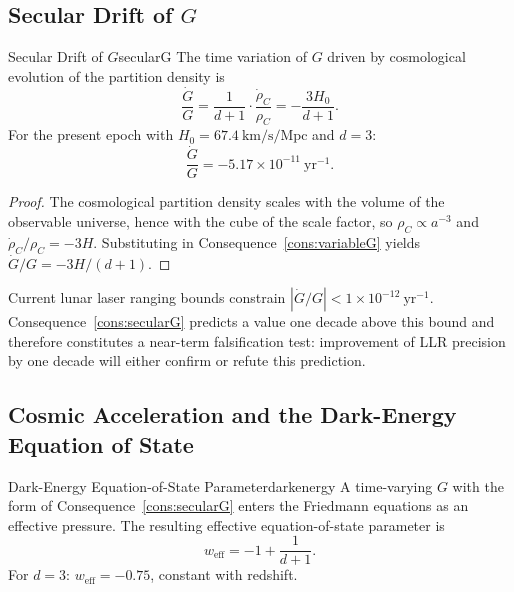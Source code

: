 \subsection{Secular Drift of $G$}
\label{sec:ch20-Gdot}

\begin{consequence}{Secular Drift of $G$}{secularG}
  The time variation of $G$ driven by cosmological evolution of the partition
  density is
  \begin{equation}\label{eq:secularG}
    \frac{\dot{G}}{G} = \frac{1}{d+1}\cdot\frac{\dot{\rho}_{C}}{\rho_{C}}
                      = -\frac{3H_{0}}{d+1}.
  \end{equation}
  For the present epoch with $H_{0} = 67.4~\mathrm{km/s/Mpc}$ and $d = 3$:
  \begin{equation}
    \frac{\dot{G}}{G} = -5.17\times10^{-11}~\mathrm{yr}^{-1}.
  \end{equation}
\end{consequence}

\begin{proof}
The cosmological partition density scales with the volume of the observable
universe, hence with the cube of the scale factor, so $\rho_{C} \propto a^{-3}$
and $\dot{\rho}_{C}/\rho_{C} = -3H$.
Substituting in Consequence~\ref{cons:variableG} yields
$\dot{G}/G = -3H/(d+1)$.
\end{proof}

\begin{remark}
Current lunar laser ranging bounds constrain $|\dot{G}/G| < 1\times10^{-12}~\mathrm{yr}^{-1}$.
Consequence~\ref{cons:secularG} predicts a value one decade above this bound
and therefore constitutes a near-term falsification test: improvement of LLR
precision by one decade will either confirm or refute this prediction.
\end{remark}

\subsection{Cosmic Acceleration and the Dark-Energy Equation of State}
\label{sec:ch20-darkenergy}

\begin{consequence}{Dark-Energy Equation-of-State Parameter}{darkenergy}
  A time-varying $G$ with the form of Consequence~\ref{cons:secularG} enters
  the Friedmann equations as an effective pressure.
  The resulting effective equation-of-state parameter is
  \begin{equation}\label{eq:darkenergy}
    w_{\mathrm{eff}} = -1 + \frac{1}{d+1}.
  \end{equation}
  For $d = 3$: $w_{\mathrm{eff}} = -0.75$, constant with redshift.
\end{consequence}

